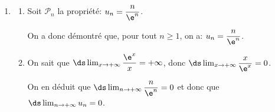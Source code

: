 \begin{enumerate}
\begin{enumerate}
La suite $\left(u_{n}\right)$ est décroissante.
		
		\item 
Pour tout $n$, $u_n>0$ donc la suite $(u_n)$ est minorée par 0.

On a démontré que cette suite était décroissante donc, d'après le théorème de la convergence monotone, la suite $(u_n)$ est convergente.		
		\end{enumerate}

	\item \begin{enumerate}
		\item Soit $\mathcal{P}_n$ la propriété: $u_{n}=\dfrac{n}{\e^{n}}$.
		
		
On a donc démontré que, pour tout $n\geqslant 1$, on a: $u_{n}=\dfrac{n}{\e^{n}}$.

		\item 
On sait que
$\ds\lim _{x\to +\infty} \dfrac{\e^{x}}{x}=+\infty$,
donc		
$\ds\lim _{x\to +\infty} \dfrac{x}{\e^{x}}=0$.

On en déduit que
$\ds\lim _{n\to +\infty} \dfrac{n}{\e^{n}}=0$
et donc que
$\ds\lim _{n\to +\infty} u_n=0$.

	\end{enumerate}
\end{enumerate}

\bigskip
